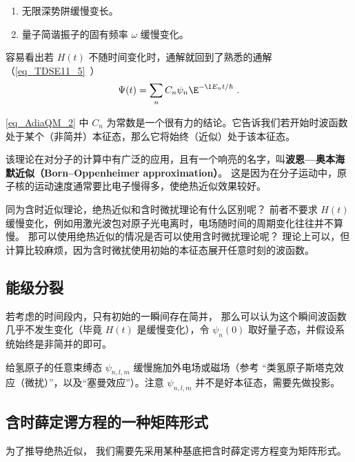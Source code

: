 \begin{example}{}
\begin{enumerate}
\item 无限深势阱缓慢变长。
\item 量子简谐振子的固有频率 $\omega$ 缓慢变化。
\end{enumerate}
\end{example}

容易看出若 $H(t)$ 不随时间变化时，通解就回到了熟悉的通解（\autoref{eq_TDSE11_5}~）
\begin{equation}
\Psi(t) = \sum_n C_n \psi_n \E^{-\I E_n t/\hbar}~.
\end{equation}

\autoref{eq_AdiaQM_2} 中 $C_n$ 为常数是一个很有力的结论。它告诉我们若开始时波函数处于某个（非简并）本征态，那么它将始终（近似）处于该本征态。

该理论在对分子的计算中有广泛的应用，且有一个响亮的名字，叫\textbf{波恩—奥本海默近似（Born–Oppenheimer approximation）}。 这是因为在分子运动中，原子核的运动速度通常要比电子慢得多，使绝热近似效果较好。

同为含时近似理论，绝热近似和含时微扰理论有什么区别呢？ 前者不要求 $H(t)$ 缓慢变化，例如用激光波包对原子光电离时，电场随时间的周期变化往往并不算慢。 那可以使用绝热近似的情况是否可以使用含时微扰理论呢？ 理论上可以，但计算比较麻烦，因为含时微扰使用初始的本征态展开任意时刻的波函数。

\subsection{能级分裂}
若考虑的时间段内，只有初始的一瞬间存在简并， 那么可以认为这个瞬间波函数几乎不发生变化（毕竟 $H(t)$ 是缓慢变化），令 $\psi_n(0)$ 取好量子态，并假设系统始终是非简并的即可。
\begin{example}{}
给氢原子的任意束缚态 $\psi_{n,l,m}$ 缓慢施加外电场或磁场（参考 “类氢原子斯塔克效应（微扰）”，以及“塞曼效应”）。注意 $\psi_{n,l,m}$ 并不是好本征态，需要先做投影。
\end{example}

\subsection{含时薛定谔方程的一种矩阵形式}
为了推导绝热近似， 我们需要先采用某种基底把含时薛定谔方程变为矩阵形式。

